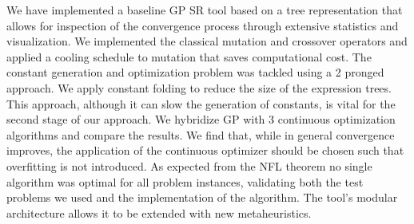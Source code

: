 We have implemented a baseline GP SR tool based on a tree representation that allows for inspection of the convergence process through extensive statistics and visualization. We implemented the classical mutation and crossover operators and applied a cooling schedule to mutation that saves computational cost. The constant generation and optimization problem was tackled using a 2 pronged approach. We apply constant folding to reduce the size of the expression trees. This approach, although it can slow the generation of constants, is vital for the second stage of our approach. We hybridize GP with 3 continuous optimization algorithms and compare the results. We find that, while in general convergence improves, the application of the continuous optimizer should be chosen such that overfitting is not introduced. As expected from the NFL theorem no single algorithm was optimal for all problem instances, validating both the test problems we used and the implementation of the algorithm. The tool's modular architecture allows it to be extended with new metaheuristics. 